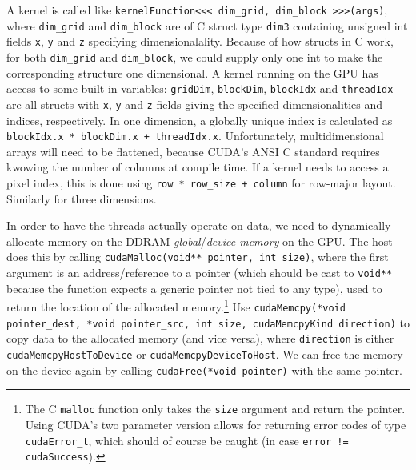\documentclass[table, xcdraw]{article}%
\begin{document}
A kernel is called like \texttt{kernelFunction<<< dim_grid, dim_block >>>(args)}, where \texttt{dim_grid} and \texttt{dim_block} are of C struct type \texttt{dim3} containing unsigned int fields \texttt{x}, \texttt{y} and \texttt{z} specifying dimensionalality. Because of how structs in C work, for both \texttt{dim_grid} and \texttt{dim_block}, we could supply only one int to make the corresponding structure one dimensional. A kernel running on the GPU has access to some built-in variables: \texttt{gridDim}, \texttt{blockDim}, \texttt{blockIdx} and \texttt{threadIdx} are all structs with \texttt{x}, \texttt{y} and \texttt{z} fields giving the specified dimensionalities and indices, respectively. In one dimension, a globally unique index is calculated as \texttt{blockIdx.x * blockDim.x + threadIdx.x}. Unfortunately, multidimensional arrays will need to be flattened, because CUDA's ANSI C standard requires kwowing the number of columns at compile time. If a kernel needs to access a pixel index, this is done using \texttt{row * row_size + column} for row-major layout. Similarly for three dimensions.

In order to have the threads actually operate on data, we need to dynamically allocate memory on the DDRAM \emph{global}/\emph{device memory} on the GPU. The host does this by calling \texttt{cudaMalloc(void** pointer, int size)}, where the first argument is an address/reference to a pointer (which should be cast to \texttt{void**} because the function expects a generic pointer not tied to any type), used to return the location of the allocated memory.\footnote{The C \texttt{malloc} function only takes the \texttt{size} argument and return the pointer. Using CUDA's two parameter version allows for returning error codes of type \texttt{cudaError_t}, which should of course be caught (in case \texttt{error != cudaSuccess}).} Use \texttt{cudaMemcpy(*void pointer_dest, *void pointer_src, int size, cudaMemcpyKind direction)} to copy data to the allocated memory (and vice versa), where \texttt{direction} is either \texttt{cudaMemcpyHostToDevice} or \texttt{cudaMemcpyDeviceToHost}. We can free the memory on the device again by calling \texttt{cudaFree(*void pointer)} with the same pointer.
\end{document}
